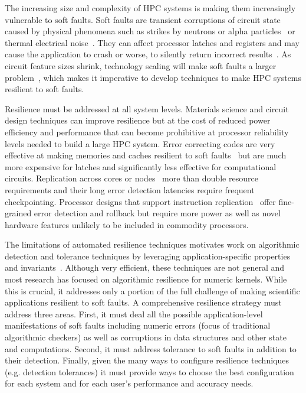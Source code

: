 \documentclass[10pt, conference, compsocconf]{IEEEtran}
\begin{document}
The increasing size and complexity of HPC systems is making them increasingly vulnerable to soft faults.
Soft faults are transient corruptions of circuit state caused by physical phenomena such as strikes by neutrons or alpha particles~\cite{baumann:2005, asciQSER:2005} or thermal electrical noise~\cite{therm_noise:2007}.
They can affect processor latches and registers and may cause the application to crash or worse, to silently return incorrect results~\cite{mpi_ser:reed:2004}.
As circuit feature sizes shrink, technology scaling will make soft faults a larger problem~\cite{err_scaling:2012}, %
which makes it imperative to develop techniques to make HPC systems resilient to soft faults.

Resilience must be addressed at all system levels.
Materials science and circuit design techniques can improve resilience but at the cost of reduced power efficiency and performance that can become prohibitive at processor reliability levels needed to build a large HPC system.
Error correcting codes are very effective at making memories and caches resilient to soft faults~\cite{mem_errors:2010} but are much more expensive for latches and significantly less effective for computational circuits.
Replication across cores or nodes~\cite{rmpi:2011, dyn_cmp_repl:2007} more than double resource requirements and their long error detection latencies require frequent checkpointing.
Processor designs that support instruction replication~\cite{repl_smt:2000} offer fine-grained error detection and rollback but require more power as well as novel hardware features unlikely to be included in commodity processors.

The limitations of automated resilience techniques motivates work on algorithmic detection and tolerance techniques by leveraging application-specific properties and invariants~\cite{amg_abft:2012, robustification:2010, abft:1984}.
Although very efficient, these techniques are not general and most research has focused on algorithmic resilience for numeric kernels.
While this is crucial, it addresses only a portion of the full challenge of making scientific applications resilient to soft faults.
A comprehensive resilience strategy must address three areas.
First, it must deal all the possible application-level manifestations of soft faults including numeric errors (focus of traditional algorithmic checkers) as well as corruptions in data structures and other state and computations.
Second, it must address tolerance to soft faults in addition to their detection.
Finally, given the many ways to configure resilience techniques (e.g. detection tolerances) it must provide ways to choose the best configuration for each system and for each user's performance and accuracy needs.
\end{document}

